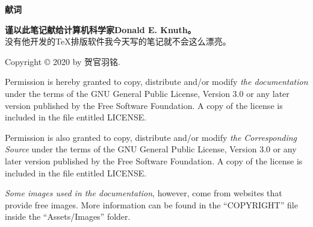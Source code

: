 \begin{center}
\begin{LARGE}
\textbf{献词}
\end{LARGE}

\medskip
{\large \textbf{\textcolor{green!60!black}
{谨以此笔记献给计算机科学家Donald E. Knuth。}}}
\\没有他开发的\TeX 排版软件我今天写的笔记就不会这么漂亮。
\end{center}

\vfill
Copyright \copyright{} 2020 by 贺官羽铭.

Permission is hereby granted to copy, distribute and/or modify 
\emph{the documentation} under the terms of the \textsc{GNU} General Public License, 
Version 3.0 or any later version published by the Free Software Foundation.
A copy of the license is included in the file entitled LICENSE.

Permission is also granted to copy, distribute and/or modify 
\emph{the Corresponding Source} under the terms of the \textsc{GNU} General Public 
License, Version 3.0 or any later version published by the Free Software Foundation.
A copy of the license is included in the file entitled LICENSE.

\emph{Some images used in the documentation}, however, come from websites that 
provide free images. More information can be found in the ``COPYRIGHT'' file inside 
the ``Assets/Images'' folder.